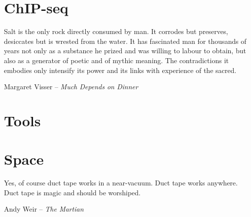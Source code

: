 \documentclass[PhD]{ucdavisthesis}
\begin{document}




\part{ChIP-seq}

\epigraph{Salt is the only rock directly consumed by man. It corrodes but preserves, desiccates but is wrested from the water. It has fascinated man for thousands of years not only as a substance he prized and was willing to labour to obtain, but also as a generator of poetic and of mythic meaning. The contradictions it embodies only intensify its power and its links with experience of the sacred.}{Margaret Visser -- {\em Much Depends on Dinner}}




\part{Tools}




\part{Space}

\epigraph{Yes, of course duct tape works in a near-vacuum. Duct tape works anywhere. Duct tape is magic and should be worshiped.}{Andy Weir -- {\em The Martian}}



\end{document}
